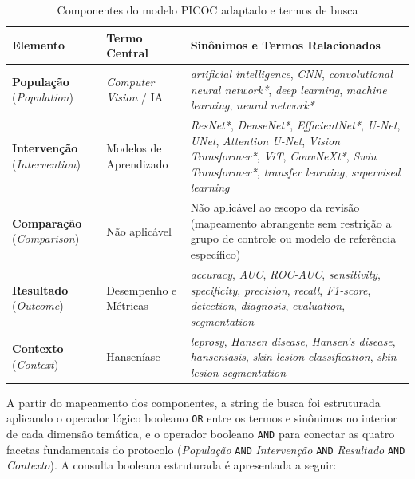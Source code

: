 \begin{table}[htb]
\centering
\caption{Componentes do modelo PICOC adaptado e termos de busca}
\label{tab:picoc-termos}
\small
\begin{tabular}{p{2.6cm} p{3.2cm} p{8.2cm}}
\toprule
\textbf{Elemento} & \textbf{Termo Central} & \textbf{Sinônimos e Termos Relacionados} \\
\midrule
\textbf{População} (\textit{Population}) & \textit{Computer Vision} / IA & \textit{artificial intelligence}, \textit{CNN}, \textit{convolutional neural network*}, \textit{deep learning}, \textit{machine learning}, \textit{neural network*} \\
\textbf{Intervenção} (\textit{Intervention}) & Modelos de Aprendizado & \textit{ResNet*}, \textit{DenseNet*}, \textit{EfficientNet*}, \textit{U-Net}, \textit{UNet}, \textit{Attention U-Net}, \textit{Vision Transformer*}, \textit{ViT}, \textit{ConvNeXt*}, \textit{Swin Transformer*}, \textit{transfer learning}, \textit{supervised learning} \\
\textbf{Comparação} (\textit{Comparison}) & Não aplicável & Não aplicável ao escopo da revisão (mapeamento abrangente sem restrição a grupo de controle ou modelo de referência específico) \\
\textbf{Resultado} (\textit{Outcome}) & Desempenho e Métricas & \textit{accuracy}, \textit{AUC}, \textit{ROC-AUC}, \textit{sensitivity}, \textit{specificity}, \textit{precision}, \textit{recall}, \textit{F1-score}, \textit{detection}, \textit{diagnosis}, \textit{evaluation}, \textit{segmentation} \\
\textbf{Contexto} (\textit{Context}) & Hanseníase & \textit{leprosy}, \textit{Hansen disease}, \textit{Hansen's disease}, \textit{hanseniasis}, \textit{skin lesion classification}, \textit{skin lesion segmentation} \\
\bottomrule
\end{tabular}
\end{table}

A partir do mapeamento dos componentes, a string de busca foi estruturada aplicando o operador lógico booleano \texttt{OR} entre os termos e sinônimos no interior de cada dimensão temática, e o operador booleano \texttt{AND} para conectar as quatro facetas fundamentais do protocolo (\textit{População} \texttt{AND} \textit{Intervenção} \texttt{AND} \textit{Resultado} \texttt{AND} \textit{Contexto}). A consulta booleana estruturada é apresentada a seguir:

